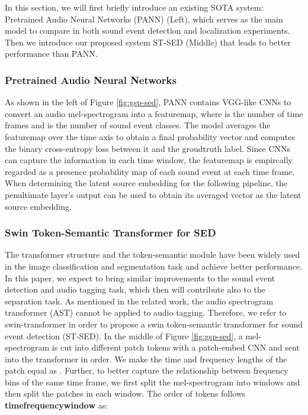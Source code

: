 \documentclass[letterpaper]{article} \usepackage{aaai22}  \usepackage{times}  \usepackage{helvet}  \usepackage{courier}  \usepackage[hyphens]{url}  \usepackage{graphicx} \urlstyle{rm} \def\UrlFont{\rm}  \usepackage{natbib}  \usepackage{caption} \DeclareCaptionStyle{ruled}{labelfont=normalfont,labelsep=colon,strut=off} \frenchspacing  \setlength{\pdfpagewidth}{8.5in}  \setlength{\pdfpageheight}{11in}  \usepackage{algorithm}
\begin{document}
In this section, we will first briefly introduce an existing SOTA system: Pretrained Audio Neural Networks (PANN) (Left), which serves as the main model to compare in both sound event detection and localization experiments. Then we introduce our proposed system ST-SED (Middle) that leads to better performance than PANN.


\subsubsection{Pretrained Audio Neural Networks}
As shown in the left of Figure \ref{fig:gsp-sed}, PANN contains VGG-like CNNs \cite{vggnet} to convert an audio mel-spectrogram into a  featuremap, where  is the number of time frames and  is the number of sound event classes. The model averages the featuremap over the time axis to obtain a final probability vector  and computes the binary cross-entropy loss between it and the groudtruth label. Since CNNs can capture the information in each time window, the featuremap  is empircally regarded as a presence probability map of each sound event at each time frame. When determining the latent source embedding for the following pipeline, the penultimate layer's output  can be used to obtain its averaged vector  as the latent source embedding. 

\subsubsection{Swin Token-Semantic Transformer for SED}
The transformer structure \cite{transformer} and the token-semantic module \cite{tscam} have been widely used in the image classification and segmentation task and achieve better performance. In this paper, we expect to bring similar improvements to the sound event detection and audio tagging task, which then will contribute also to the separation task. As mentioned in the related work, the audio spectrogram transformer (AST) cannot be applied to audio tagging. Therefore, we refer to swin-transformer \cite{swintransformer} in order to propose a swin token-semantic transformer for sound event detection (ST-SED). In the middle of Figure \ref{fig:gsp-sed}, a mel-spectrogram is cut into different patch tokens with a patch-embed CNN and sent into the transformer in order. We make the time and frequency lengths of the patch equal as . 
Further, to better capture the relationship between frequency bins of the same time frame, we first split the mel-spectrogram into windows  and then split the patches in each window. The order of tokens  follows \textbf{timefrequencywindow} as:
\end{document}
